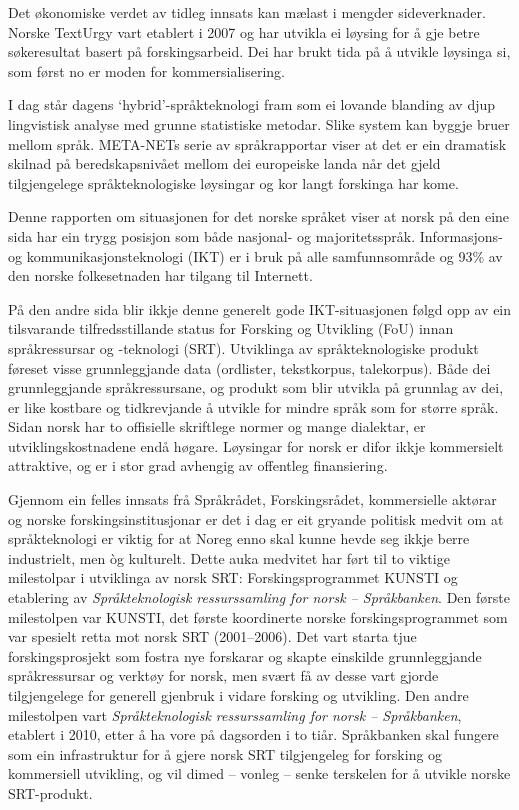 \begin{multicols}{2}
Det økonomiske verdet av tidleg innsats kan mælast i mengder sideverknader. Norske TextUrgy vart etablert i 2007 og har utvikla ei løysing for å gje betre søkeresultat basert på forskingsarbeid. Dei har brukt tida på å utvikle løysinga si, som først no er moden for kommersialisering. 


I dag står dagens `hybrid'-språkteknologi fram som ei lovande blanding av djup lingvistisk analyse med grunne statistiske metodar. Slike system kan byggje bruer mellom språk. META-NETs serie av språkrapportar viser at det er ein dramatisk skilnad på beredskapsnivået mellom dei europeiske landa når det gjeld tilgjengelege språkteknologiske løysingar og kor langt forskinga har kome. 

Denne rapporten om situasjonen for det norske språket viser at norsk på den eine sida har ein trygg posisjon som både nasjonal- og majoritetsspråk. Informasjons- og kommunikasjonsteknologi (IKT) er i bruk på alle samfunnsområde og 93\% av den norske folkesetnaden har tilgang til Internett. 

På den andre sida blir ikkje denne generelt gode IKT-situasjonen følgd opp av ein tilsvarande tilfredsstillande status for Forsking og Utvikling (FoU) innan språkressursar og -teknologi (SRT). Utviklinga av språkteknologiske produkt føreset visse grunnleggjande data (ordlister, tekstkorpus, talekorpus). Både dei grunnleggjande språkressursane, og produkt som blir utvikla på grunnlag av dei, er like kostbare og tidkrevjande å utvikle for mindre språk som for større språk. Sidan norsk har to offisielle skriftlege normer og mange dialektar, er utviklingskostnadene endå høgare. Løysingar for norsk er difor ikkje kommersielt attraktive, og er i stor grad avhengig av offentleg finansiering. 

Gjennom ein felles innsats frå Språkrådet, Forskingsrådet, kommersielle aktørar og norske forskingsinstitusjonar er det i dag er eit gryande politisk medvit om at språkteknologi er viktig for at Noreg enno skal kunne hevde seg ikkje berre industrielt, men òg kulturelt. 
Dette auka medvitet har ført til to viktige milestolpar i utviklinga av norsk SRT: Forskingsprogrammet KUNSTI og etablering av \textit{Språkteknologisk ressurssamling for norsk – Språkbanken}.
Den første milestolpen var KUNSTI, det første koordinerte norske forskingsprogrammet som var spesielt retta mot norsk SRT (2001–2006). Det vart starta tjue forskingsprosjekt som fostra nye forskarar og skapte einskilde grunnleggjande språkressursar og verktøy for norsk, men svært få av desse vart gjorde tilgjengelege for generell gjenbruk i vidare forsking og utvikling.
Den andre milestolpen vart \textit{Språkteknologisk ressurssamling for norsk – Språkbanken}, etablert i 2010, etter å ha vore på dagsorden i to tiår. Språkbanken skal fungere som ein infrastruktur for å gjere norsk SRT tilgjengeleg for forsking og kommersiell utvikling, og vil dimed – vonleg – senke terskelen for å utvikle norske SRT-produkt. 


\end{multicols}
